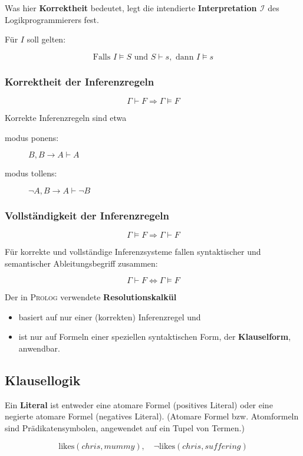 \documentclass[runningheads,deutsch]{llncs}
\begin{document}
Was hier \textbf{Korrektheit} bedeutet, legt die intendierte \textbf{Interpretation  $\mathcal I$} des Logikprogrammierers fest.


Für $I$ soll gelten:

\[ \text{Falls } I \vDash S \text{ und } S \vdash s, \text{ dann } I \vDash s \]

\subsubsection{Korrektheit der Inferenzregeln}
\[ \Gamma \vdash F \Rightarrow \Gamma \vDash F \]

\parindent 0mm
Korrekte Inferenzregeln sind etwa
\begin{description}
    \item[modus ponens:] $B, B \rightarrow A \vdash A$
    \item[modus tollens:] $\lnot A, B \rightarrow A \vdash \lnot B$ 
\end{description}

\subsubsection{Vollständigkeit der Inferenzregeln}
\[ \Gamma \vDash F \Rightarrow \Gamma \vdash F \]

Für korrekte und vollständige Inferenzsysteme fallen syntaktischer und semantischer Ableitungsbegriff zusammen:

\[ \Gamma \vdash F \Leftrightarrow \Gamma \vDash F \]

Der in \textsc{Prolog} verwendete \textbf{Resolutionskalkül}
\begin{itemize}
    \item basiert auf nur einer (korrekten) Inferenzregel und
    \item ist nur auf Formeln einer speziellen syntaktischen Form, der \textbf{Klauselform}, anwendbar.
\end{itemize}

\subsection{Klausellogik}

Ein \textbf{Literal} ist entweder eine atomare Formel (positives Literal) oder eine negierte atomare Formel (negatives Literal). (Atomare Formel bzw. Atomformeln sind Prädikatensymbolen, angewendet auf ein Tupel von Termen.)

\begin{example}
    \[ \text{likes}(chris, mummy), \quad \lnot\text{likes}(chris, suffering) \]
\end{example}
\end{document}
